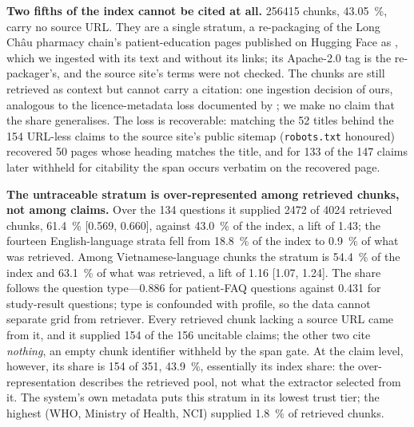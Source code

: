 \documentclass[conference,a4paper]{IEEEtran}
\begin{document}
\textbf{Two fifths of the index cannot be cited at all.} \num{256415} chunks,
\SI{43.05}{\percent}, carry no source URL. They are a single stratum, a re-packaging of the
Long Ch\^au pharmacy chain's patient-education pages published on Hugging Face as
, which we ingested with its text and without its
links; its Apache-2.0 tag is the re-packager's, and the source site's terms were not checked. The chunks are still
retrieved as context but cannot carry a citation: one ingestion decision of ours, analogous
to the licence-metadata loss documented by \cite{longpre2024provenance}; we make no claim
that the share generalises. The loss is recoverable: matching the 52 titles behind the 154 URL-less claims to
the source site's public sitemap (\texttt{robots.txt} honoured) recovered 50 pages whose
heading matches the title, and for 133 of the 147 claims later withheld for citability the
span occurs verbatim on the recovered page.

\textbf{The untraceable stratum is over-represented among retrieved chunks, not among
claims.} Over the 134 questions it supplied \num{2472} of \num{4024} retrieved chunks,
\SI{61.4}{\percent} [\num{0.569}, \num{0.660}], against \SI{43.0}{\percent} of the index, a
lift of \num{1.43};
the fourteen English-language strata fell from \SI{18.8}{\percent} of the index to
\SI{0.9}{\percent} of what was retrieved. Among Vietnamese-language chunks the stratum is
\SI{54.4}{\percent} of the index and \SI{63.1}{\percent} of what was retrieved, a lift of
\num{1.16} [\num{1.07}, \num{1.24}]. The share follows the question type---\num{0.886} for
patient-FAQ questions against \num{0.431} for study-result questions; type is confounded with
profile, so the data cannot separate grid from retriever. Every retrieved chunk lacking a source URL came from it, and it
supplied \num{154} of the \num{156} uncitable claims; the other two cite \emph{nothing}, an
empty chunk identifier withheld by the span gate. At the claim level, however, its share is
\num{154} of \num{351}, \SI{43.9}{\percent}, essentially its index share: the
over-representation describes the retrieved pool, not what the extractor selected from it.
The system's own metadata puts
this stratum in its lowest trust tier; the highest (WHO, Ministry of Health, NCI) supplied
\SI{1.8}{\percent} of retrieved chunks.
\end{document}
